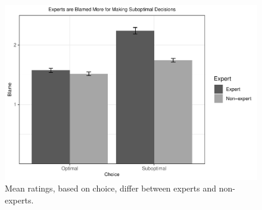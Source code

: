 \documentclass[
  man,floatsintext]{apa6}
\begin{document}
\begin{figure}
\centering
\includegraphics{3-2_in-class_ScientificReportManuscriptDraft4_files/figure-latex/fig-plot-1-1.pdf}
\caption{\label{fig:fig-plot-1}Mean ratings, based on choice, differ between experts and non-experts.}
\end{figure}
\end{document}
